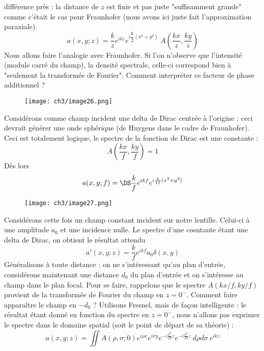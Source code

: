 différence près : la distance de $z$ est finie et pas juste "suffisamment grande" comme c'était le cas 
pour Fraunhofer (nous avons ici juste fait l'approximation paraxiale).
\begin{equation}
a(x,y;z) = \dfrac{k}{z} e^{ikz} e^{i\dfrac{k}{2}(x^2+y^2)}\ A\left(\frac{kx}{z},\frac{ky}{z}\right)
\end{equation}
Nous allons faire l'analogie avec Fraunhofer. Si l'on n'observe que l'intensité (module carré du 
champ), la densité spectrale, celle-ci correspond bien à "seulement la transformée de Fourier". Comment 
interpréter ce facteur de phase additionnel ? \\

	\begin{wrapfigure}[8]{r}{5cm}
	\vspace{-8mm}
	\texttt{[image: ch3/image26.png]}
	\end{wrapfigure}		
Considérons comme champ incident une delta de Dirac centrée à l'origine : ceci devrait générer une onde 
sphérique (de Huygens dans le cadre de Fraunhofer). Ceci est totalement logique, le spectre de la 
fonction de Dirac est une constante :
\begin{equation}
A\left(\frac{kx}{f},\frac{ky}{f}\right)=1
\end{equation}
Dès lors
\begin{equation}
a(x,y;f) = \DS \dfrac{k}{f}e^{ikf} e^{i\frac{k}{2f}(x^2+y^2)}
\end{equation}

	\begin{wrapfigure}[9]{l}{5cm}
	\vspace{-12mm}
	\texttt{[image: ch3/image27.png]}
	\end{wrapfigure}	
Considérons cette fois un champ constant incident sur notre lentille. Celui-ci à une amplitude $a_0$ et 
une incidence nulle. Le spectre d'une cosntante étant une delta de Dirac, on obtient le résultat attendu
\begin{equation}
a'(x,y;z) = \frac{k}{f}e^{ikf}a_0\delta(x,y)
\end{equation}
Généralisons à toute distance  : on ne s'intéressant qu'au plan d'entrée, considérons maintenant une 
distance $d_0$ du plan d'entrée et on s'intéresse au champ dans le plan focal. Pour se faire, rappelons 
que le spectre $A(kx/f,ky/f)$ provient de la transformée de Fourier du champ en $z=0^-$. Comment faire 
apparaître le champ en $-d_0$ ? Utilisons Fresnel, mais de façon intelligente : le résultat étant donné 
en fonction du spectre en $z=0^-$, nous n'allons pas exprimer le spectre dans le domaine spatial (soit 
le point de départ de sa théorie) :
\begin{equation}
a(x,y;z) = \iint A(\rho,\sigma;0)e^{i\rho x}e^{i\sigma y} e^{-i\frac{\rho^2}{2k}z}
e^{-i\frac{\sigma^2}{2k}z}\ d\rho d\sigma\ e^{ikz}
\end{equation}

